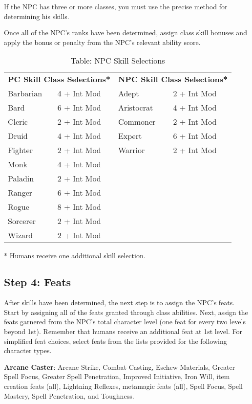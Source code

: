 If the NPC has three or more classes, you must use the precise method for determining his skills. 
				
Once all of the NPC's ranks have been determined, assign class skill bonuses and apply the bonus or penalty from the NPC's relevant ability score.
	
\begin{table}[]
\sffamily
\caption{Table: NPC Skill Selections}
\begin{tabular}{llll}
\multicolumn{2}{c}{\textbf{PC Skill Class Selections*}} & \multicolumn{2}{c}{\textbf{NPC Skill Class Selections*}}\\
Barbarian & 4 + Int Mod & Adept & 2 + Int Mod\\
Bard & 6 + Int Mod & Aristocrat &  4 + Int Mod\\
Cleric & 2 + Int Mod & Commoner & 2 + Int Mod\\
Druid & 4 + Int Mod & Expert & 6 + Int Mod\\
Fighter & 2 + Int Mod & Warrior & 2 + Int Mod\\
Monk & 4 + Int Mod &  & \\
Paladin & 2 + Int Mod &  & \\
Ranger & 6 + Int Mod &  & \\
Rogue & 8 + Int Mod &  & \\
Sorcerer & 2 + Int Mod &  & \\
Wizard & 2 + Int Mod &  & \\
\end{tabular}
* Humans receive one additional skill selection.\\
\end{table}

\subsection{Step 4: Feats}

				
After skills have been determined, the next step is to assign the NPC's feats. Start by assigning all of the feats granted through class abilities. Next, assign the feats garnered from the NPC's total character level (one feat for every two levels beyond 1st). Remember that humans receive an additional feat at 1st level. For simplified feat choices, select feats from the lists provided for the following character types.
				
\textbf{Arcane Caster}: Arcane Strike, Combat Casting, Eschew Materials, Greater Spell Focus, Greater Spell Penetration, Improved Initiative, Iron Will, item creation feats (all), Lightning Reflexes, metamagic feats (all), Spell Focus, Spell Mastery, Spell Penetration, and Toughness.
				
